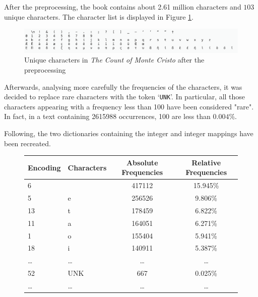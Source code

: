 \documentclass[a4paper,12pt]{article} %
\begin{document}
	After the preprocessing, the book contains about 2.61 million characters 
	and $103$ unique characters. The character list is displayed in Figure 
	\ref{fig:preprocessed}.
	
	\begin{figure}[htb]
		\centering
		\includegraphics[width=\linewidth]{preprocessed.png}	
		\caption{Unique characters in \textit{The Count of Monte Cristo} after 
		the preprocessing}
		\label{fig:preprocessed}
	\end{figure}
	
	Afterwards, analysing more carefully the frequencies of the characters, it 
	was decided to replace rare characters with the token `\texttt{UNK}'. In 
	particular, all those characters appearing with a frequency less than 
	100 have been considered "rare". In fact, in a text containing 2615988 
	occurrences, 100 are less than $0.004\%$.
	\bigskip
	
	Following, the two dictionaries containing the integer and integer mappings 
	have been recreated.
	\bigskip
	
	\begin{figure}[htb]
		\centering
		\begin{tabular}{llcc}
			\toprule
			Encoding & Characters &  Absolute Frequencies & Relative 
			Frequencies \\
			\midrule
			6        &           &                417112 &              
			15.945\% \\
			5        &         e &                256526 &               
			9.806\% \\
			13       &         t &                178459 &               
			6.822\% \\
			11       &         a &                164051 &               
			6.271\% \\
			1        &         o &                155404 &               
			5.941\% \\
			18       &         i &                140911 &               
			5.387\% \\
			\dots       &         \dots &                \dots 
			&             \dots \\
			52       &       UNK &                   667 &               
			0.025\% \\
			\dots       &         \dots &                \dots 
			&             \dots \\
			\bottomrule
		\end{tabular}
		\label{tab:statistics2}
	\end{figure}
\end{document}
